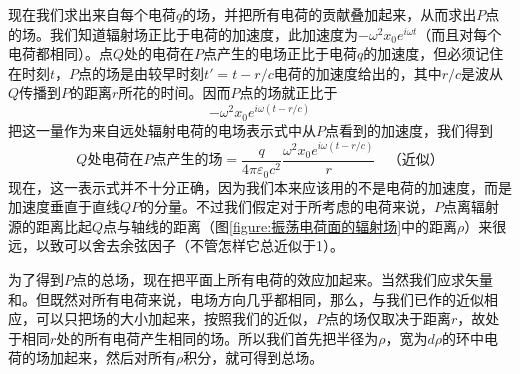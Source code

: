 现在我们求出来自每个电荷$q$的场，并把所有电荷的贡献叠加起来，从而求出$P$点的场。我们知道辐射场正比于电荷的加速度，此加速度为$-\omega^2x_0e^{i\omega t}$（而且对每个电荷都相同）。点$Q$处的电荷在$P$点产生的电场正比于电荷$q$的加速度，但必须记住在时刻$t$，$P$点的场是由较早时刻$t'=t-r/c$电荷的加速度给出的，其中$r/c$是波从$Q$传播到$P$的距离$r$所花的时间。因而$P$点的场就正比于
\begin{equation}
    \label{Eq:I:30:10}
    -\omega^2x_0e^{i\omega(t-r/c)}
\end{equation}
把这一量作为来自远处辐射电荷的电场表示式中从$P$点看到的加速度，我们得到
\begin{equation}
    \label{Eq:I:30:11}
    \text{$Q$处电荷在$P$点产生的场}=\frac{q}{4\pi\varepsilon_0c^2}\frac{\omega^2x_0e^{i\omega(t-r/c)}}{r} ~~~~\text{（近似）}
\end{equation}
现在，这一表示式并不十分正确，因为我们本来应该用的不是电荷的加速度，而是加速度垂直于直线$QP$的分量。不过我们假定对于所考虑的电荷来说，$P$点离辐射源的距离比起$Q$点与轴线的距离（图\ref{figure:振荡电荷面的辐射场}中的距离$\rho$）来很远，以致可以舍去余弦因子（不管怎样它总近似于1）。

为了得到$P$点的总场，现在把平面上所有电荷的效应加起来。当然我们应求矢量和。但既然对所有电荷来说，电场方向几乎都相同，那么，与我们已作的近似相应，可以只把场的大小加起来，按照我们的近似，$P$点的场仅取决于距离$r$，故处于相同$r$处的所有电荷产生相同的场。所以我们首先把半径为$\rho$，宽为$d\rho$的环中电荷的场加起来，然后对所有$\rho$积分，就可得到总场。

